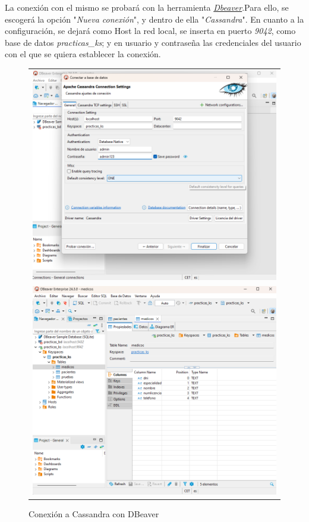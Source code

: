 \documentclass{article}
\begin{document}
La conexión con el mismo se probará con la herramienta \textit{\textcolor{blue}{\href{https://dbeaver.com/download/enterprise/}{Dbeaver}}}.Para ello, se escogerá la opción "\textit{Nueva conexión}", y dentro de ella "\textit{Cassandra}". En cuanto a la configuración, se dejará como Host la red local, se inserta en puerto \textit{9042}, como base de datos \textit{practicas\_ks}; y en usuario y contraseña las credenciales del usuario con el que se quiera establecer la conexión. 

\begin{figure}[H]
    \centering
    \begin{tabular}{c}  %
        \includegraphics[width=1\textwidth]{cassandra1.png}\\[10pt]
        \includegraphics[width=1\textwidth]{cassandra2.png} 
    \end{tabular}
    \caption{Conexión a Cassandra con DBeaver}
    \label{fig:Configuracion_DBeaver_Cassandra}
\end{figure}
\end{document}
